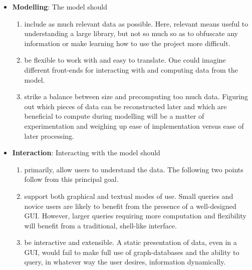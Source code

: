 \begin{itemize}

  \item \textbf{Modelling}: The model should
  \begin{enumerate}[label=\textbf{M\arabic*},ref={M\arabic*}]

    \item\label{req:m1} include as much relevant data as possible. Here,
      relevant means useful to understanding a large library, but not so much
      so as to obfuscate any information or make learning how to use the
      project more difficult.

    \item\label{req:m2} be flexible to work with and easy to translate. One
      could imagine different front-ends for interacting with and computing
      data from the model.

    \item\label{req:m3} strike a balance between size and precomputing too much
      data. Figuring out which pieces of data can be reconstructed later and
      which are beneficial to compute during modelling will be a matter of
      experimentation and weighing up ease of implementation versus ease of
      later processing.

  \end{enumerate}

  \item \textbf{Interaction}: Interacting with the model should
  \begin{enumerate}[label=\textbf{I\arabic*},ref={I\arabic*}]

    \item\label{req:i1} primarily, allow users to understand the data. The
      following two points follow from this principal goal.

    \item\label{req:i2} support both graphical and textual modes of use. Small
      queries and novice users are likely to benefit from the presence of a
      well-designed GUI\@. However, larger queries requiring more computation
      and flexibility will benefit from a traditional, shell-like interface.

    \item\label{req:i3} be interactive and extensible. A static presentation of
      data, even in a GUI, would fail to make full use of graph-databases and
      the ability to query, in whatever way the user desires, information
      dynamically.


\end{enumerate}
\end{itemize}
